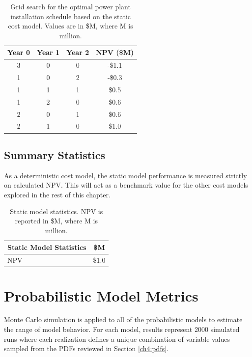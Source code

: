 \begin{table}[!htp]%
\centering
\begin{tabular}{|c|c|c|c|}
\hline
\textbf{Year 0} & \textbf{Year 1} & \textbf{Year 2} & \textbf{NPV (\$M)} \\ \hline
3 & 0 & 0 & -\$1.1 \\ \hline
1 & 0 & 2 & -\$0.3 \\ \hline
1 & 1 & 1 & \$0.5 \\ \hline
1 & 2 & 0 & \$0.6 \\ \hline
2 & 0 & 1 & \$0.6 \\ \hline
2 & 1 & 0 & \$1.0 \\ \hline
\end{tabular}
\caption[Static model module installation schedule]{Grid search for the optimal power plant installation schedule based on the static cost model. Values are in \$M, where M is million.}
\label{tab:static_optimization}
\end{table}

\subsection{Summary Statistics}\label{ch6:static_stats}
As a deterministic cost model, the static model performance is measured strictly on calculated NPV. This will act as a benchmark value for the other cost models explored in the rest of this chapter.

\begin{table}[H]
\centering
\begin{tabular}{|l|c|}
\hline
\textbf{Static Model Statistics} & \textbf{\$M} \\ \hline
NPV & \$1.0 \\ \hline
\end{tabular}
\caption[Static model statistics]{Static model statistics. NPV is reported in \$M, where M is million.}
\label{tab:static_mod_stats}
\end{table}

\section{Probabilistic Model Metrics}\label{ch6:cost_model_metrics}
Monte Carlo simulation is applied to all of the probabilistic models to estimate the range of model behavior. For each model, results represent 2000 simulated runs where each realization defines a unique combination of variable values sampled from the PDFs reviewed in Section \ref{ch4:pdfs}. 

